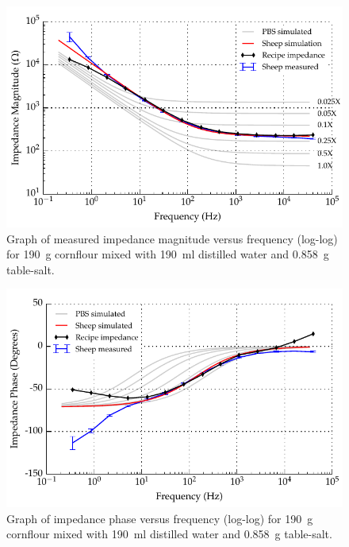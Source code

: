  \begin{figure}
      \centering
      \includegraphics[width=\textwidth]{content/pt2/graphics/run12_190ml-distilledWater_190g-cornflour_0g858-salt_ZVsF_graph_mag}
      \caption{\label{fig:recipe_cornflour_salt_extraWater_mag_improved}Graph of measured impedance magnitude versus frequency (log-log) for \SI{190}{\gram} cornflour mixed with \SI{190}{\milli\litre} distilled water and \SI{0.858}{\gram} table-salt.}
  \end{figure}

  \begin{figure}
      \centering
      \includegraphics[width=\textwidth]{content/pt2/graphics/run12_190ml-distilledWater_190g-cornflour_0g858-salt_ZVsF_graph_phase}
      \caption{\label{fig:recipe_cornflour_salt_extraWater_phase_improved}Graph of impedance phase versus frequency (log-log) for \SI{190}{\gram} cornflour mixed with \SI{190}{\milli\litre} distilled water and \SI{0.858}{\gram} table-salt.}
  \end{figure}

